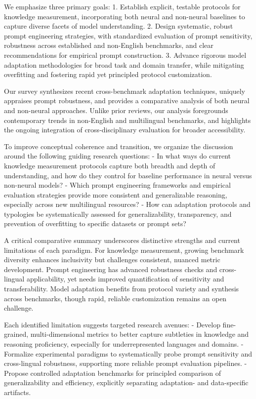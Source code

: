 \documentclass[sigconf]{acmart}
\begin{document}
We emphasize three primary goals: 
1. Establish explicit, testable protocols for knowledge measurement, incorporating both neural and non-neural baselines to capture diverse facets of model understanding.
2. Design systematic, robust prompt engineering strategies, with standardized evaluation of prompt sensitivity, robustness across established and non-English benchmarks, and clear recommendations for empirical prompt construction.
3. Advance rigorous model adaptation methodologies for broad task and domain transfer, while mitigating overfitting and fostering rapid yet principled protocol customization.

Our survey synthesizes recent cross-benchmark adaptation techniques, uniquely appraises prompt robustness, and provides a comparative analysis of both neural and non-neural approaches. Unlike prior reviews, our analysis foregrounds contemporary trends in non-English and multilingual benchmarks, and highlights the ongoing integration of cross-disciplinary evaluation for broader accessibility.

To improve conceptual coherence and transition, we organize the discussion around the following guiding research questions:
- In what ways do current knowledge measurement protocols capture both breadth and depth of understanding, and how do they control for baseline performance in neural versus non-neural models?
- Which prompt engineering frameworks and empirical evaluation strategies provide more consistent and generalizable reasoning, especially across new multilingual resources?
- How can adaptation protocols and typologies be systematically assessed for generalizability, transparency, and prevention of overfitting to specific datasets or prompt sets?

A critical comparative summary underscores distinctive strengths and current limitations of each paradigm. For knowledge measurement, growing benchmark diversity enhances inclusivity but challenges consistent, nuanced metric development. Prompt engineering has advanced robustness checks and cross-lingual applicability, yet needs improved quantification of sensitivity and transferability. Model adaptation benefits from protocol variety and synthesis across benchmarks, though rapid, reliable customization remains an open challenge.

Each identified limitation suggests targeted research avenues:
- Develop fine-grained, multi-dimensional metrics to better capture subtleties in knowledge and reasoning proficiency, especially for underrepresented languages and domains.
- Formalize experimental paradigms to systematically probe prompt sensitivity and cross-lingual robustness, supporting more reliable prompt evaluation pipelines.
- Propose controlled adaptation benchmarks for principled comparison of generalizability and efficiency, explicitly separating adaptation- and data-specific artifacts.
\end{document}
